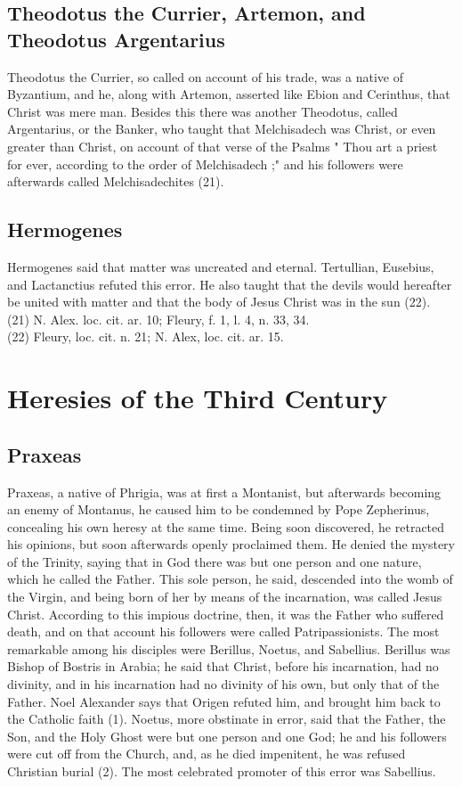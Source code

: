 \documentclass[12pt]{book}
\begin{document}
\section{Theodotus the Currier, Artemon, and Theodotus Argentarius}
Theodotus the Currier, so called on account of his trade, was a native of Byzantium, and he, along
with Artemon, asserted like Ebion and Cerinthus, that Christ was mere man. Besides this there was 
another Theodotus, called Argentarius, or the Banker, who taught that Melchisadech was Christ, or even
greater than Christ, on account of that verse of the Psalms " Thou art a priest for ever, according to the
order of Melchisadech ;" and his followers were afterwards called Melchisadechites (21).
\section{Hermogenes}
Hermogenes said that matter was uncreated and eternal. Tertullian, Eusebius, and Lactanctius refuted
this error. He also taught that the devils would hereafter be united with matter and that the body of Jesus
Christ was in the sun (22).\\
(21) N. Alex. loc. cit. ar. 10; Fleury, f. 1, l. 4, n. 33, 34. \\
(22) Fleury, loc. cit. n. 21; N. Alex, loc. cit. ar. 15.\\

\chapter{Heresies of the Third Century}
\section{Praxeas}
 Praxeas, a native of Phrigia, was at first a Montanist, but afterwards becoming an enemy of Montanus,
he caused him to be condemned by Pope Zepherinus, concealing his own heresy at the same time. Being
soon discovered, he retracted his opinions, but soon afterwards openly proclaimed them. He denied the
mystery of the Trinity, saying that in God there was but one person and one nature, which he called the
Father. This sole person, he said, descended into the womb of the Virgin, and being born of her by means
of the incarnation, was called Jesus Christ. According to this impious doctrine, then, it was the Father
who suffered death, and on that account his followers were called Patripassionists. The most remarkable
among his disciples were Berillus, Noetus, and Sabellius. Berillus was Bishop of Bostris in Arabia; he said
that Christ, before his incarnation, had no divinity, and in his incarnation had no divinity of his own, but
only that of the Father. Noel Alexander says that Origen refuted him, and brought him back to the
Catholic faith (1). Noetus, more obstinate in error, said that the Father, the Son, and the Holy Ghost were
but one person and one God; he and his followers were cut off from the Church, and, as he died
impenitent, he was refused Christian burial (2). The most celebrated promoter of this error was Sabellius.
\end{document}
